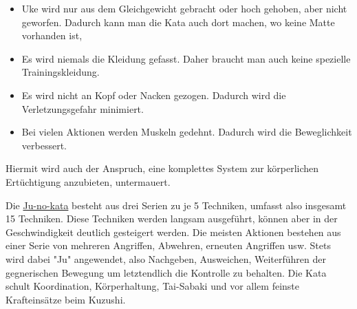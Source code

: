 \documentclass[11pt]{article}
\begin{document}
\begin{itemize}
\item Uke wird nur aus dem Gleichgewicht gebracht oder hoch gehoben, aber nicht geworfen. Dadurch kann man die Kata auch dort machen, wo keine Matte vorhanden ist,
\item Es wird niemals die Kleidung gefasst. Daher braucht man auch keine spezielle Trainingskleidung.
\item Es wird nicht an Kopf oder Nacken gezogen. Dadurch wird die Verletzungsgefahr minimiert.
\item Bei vielen Aktionen werden Muskeln gedehnt. Dadurch wird die Beweglichkeit verbessert.
\end{itemize}

Hiermit wird auch der Anspruch, eine komplettes System zur körperlichen Ertüchtigung anzubieten, untermauert.

Die \hyperref[org0f6a64a]{Ju-no-kata} besteht aus drei Serien zu je 5 Techniken, umfasst also insgesamt 15 Techniken. 
Diese Techniken werden langsam ausgeführt, können aber in der Geschwindigkeit deutlich gesteigert werden. 
Die meisten Aktionen bestehen aus einer Serie von mehreren Angriffen, Abwehren, erneuten Angriffen usw. 
Stets wird dabei "Ju" angewendet, also Nachgeben, Ausweichen, Weiterführen der gegnerischen Bewegung um letztendlich die Kontrolle zu behalten. 
Die Kata schult Koordination, Körperhaltung, Tai-Sabaki und vor allem feinste Krafteinsätze beim Kuzushi.
\end{document}
